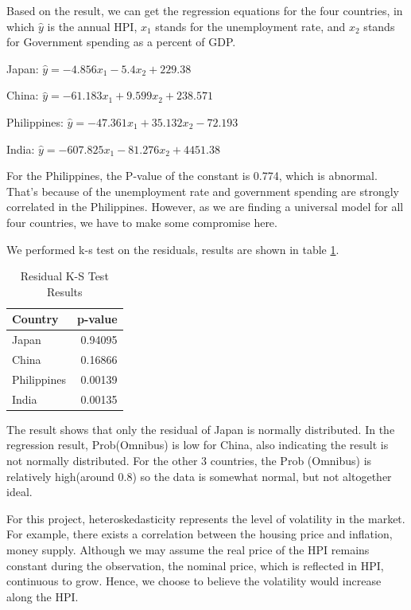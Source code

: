 \documentclass[11pt]{article}
\begin{document}
Based on the result, we can get the regression equations for the four countries, in which ${\hat y}$ is the annual HPI, $x_1$ stands for the unemployment rate, and $x_2$ stands for Government spending as a percent of GDP.

Japan: ${\hat y} = -4.856x_1 -5.4x_2 + 229.38$

China: ${\hat y} = -61.183x_1 +9.599x_2 + 238.571$

Philippines: ${\hat y} = -47.361x_1 +35.132x_2 - 72.193$

India: ${\hat y} = -607.825x_1 -81.276x_2 + 4451.38$

For the Philippines, the P-value of the constant is 0.774, which is abnormal. That's because of the unemployment rate and government spending are strongly correlated in the Philippines. However, as we are finding a universal model for all four countries, we have to make some compromise here.

We performed k-s test on the residuals, results are shown in table \ref{tab:residualks_results}.

\begin{table}[H]
\centering
\begin{tabular}{|l|r|}
\hline
Country     & p-value \\ \hline
Japan       & 0.94095 \\ \hline
China       & 0.16866 \\ \hline
Philippines & 0.00139 \\ \hline
India       & 0.00135 \\ \hline
\end{tabular}
\caption{Residual K-S Test Results}
\label{tab:residualks_results}
\end{table}

The result shows that only the residual of Japan is normally distributed. In the regression result, Prob(Omnibus) is low for China, also indicating the result is not normally distributed. For the other 3 countries, the Prob (Omnibus) is relatively high(around 0.8) so the data is somewhat normal, but not altogether ideal.

For this project, heteroskedasticity represents the level of volatility in the market. For example, there exists a correlation between the housing price and inflation, money supply. Although we may assume the real price of the HPI remains constant during the observation, the nominal price, which is reflected in HPI, continuous to grow. Hence, we choose to believe the volatility would increase along the HPI\citep{Heteroskedasticity1,Heteroskedasticity2}.
\end{document}
